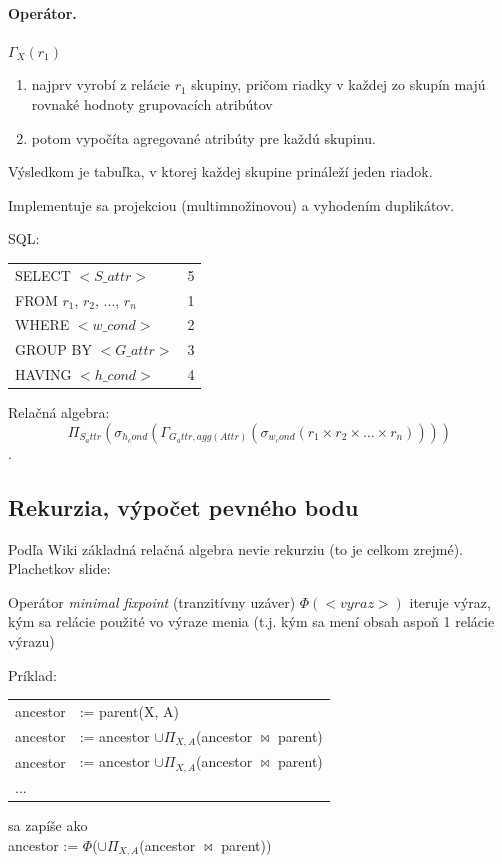 \documentclass[10pt,a4paper]{article}
\begin{document}
\paragraph{Operátor.}
$\Gamma_X(r_1)$
\begin{enumerate}
\item najprv vyrobí z relácie $r_1$ skupiny, pričom riadky v každej zo
skupín majú rovnaké hodnoty grupovacích atribútov
\item potom vypočíta agregované atribúty pre každú skupinu.
\end{enumerate}
Výsledkom je tabuľka, v ktorej každej skupine prináleží jeden
riadok.
 
Implementuje sa projekciou (multimnožinovou) a vyhodením duplikátov. 

SQL:
\begin{tabular}{lc}
SELECT $<S\_attr>$ & 5 \\
FROM $r_1$, $r_2$, ..., $r_n$ & 1 \\
WHERE $<w\_cond>$ & 2 \\
GROUP BY $<G\_attr>$ & 3 \\
HAVING $<h\_cond>$ & 4 \\
\end{tabular}

Relačná algebra: 
$$\Pi_{S_attr}(\sigma_{h_cond}(\Gamma_{G_attr, agg(Attr)}(\sigma_{w_cond}(r_1 \times r_2 \times \ldots \times r_n))))$$.


\subsection{Rekurzia, výpočet pevného bodu}

Podľa Wiki základná relačná algebra nevie rekurziu (to je celkom zrejmé). 
Plachetkov slide: 

Operátor \emph{minimal fixpoint} (tranzitívny uzáver) $\Phi(<vyraz>)$ iteruje výraz, kým sa relácie použité vo výraze
menia (t.j. kým sa mení obsah aspoň 1 relácie výrazu)

Príklad:
\begin{tabular}{ll}
ancestor &:= parent(X, A) \\
ancestor &:= ancestor $\cup \Pi_{X,A}$(ancestor $\Join$ parent) \\
ancestor &:= ancestor $\cup \Pi_{X,A}$(ancestor $\Join$ parent) \\
... & \\
\end{tabular}
sa zapíše ako\\
ancestor := $\Phi$($\cup \Pi_{X,A}$(ancestor $\Join$ parent)) \\
\end{document}
